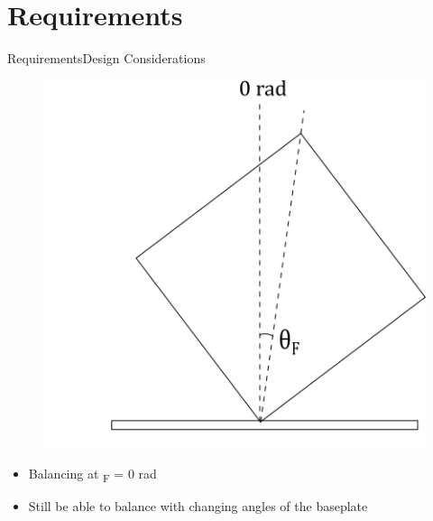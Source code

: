 
\section{Requirements}

\begin{frame}{Requirements}{Design Considerations}
	
	\begin{figure}[H]
		\includegraphics[scale=0.4]{Pictures/reqCubli0rad.png}
		\centering
	\end{figure}
	
\begin{itemize}
 \item {Balancing at \si{\theta_F} =  0 rad}
 \linebreak
\item {Still be able to balance with changing angles of the baseplate}
\end{itemize}


\end{frame}

